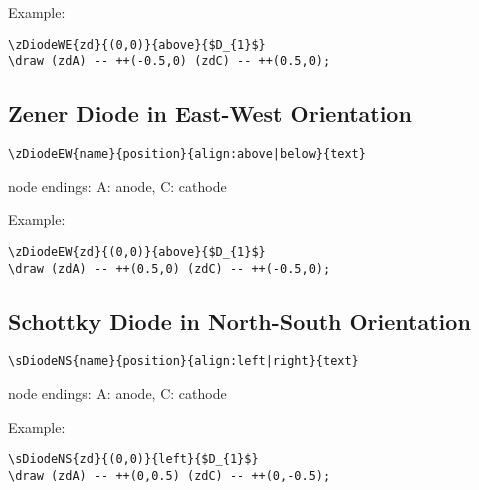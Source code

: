 \documentclass[parskip=full]{scrartcl}
\begin{document}
Example:\\
\begin{minipage}{0.8\textwidth}
\begin{verbatim}
\zDiodeWE{zd}{(0,0)}{above}{$D_{1}$}
\draw (zdA) -- ++(-0.5,0) (zdC) -- ++(0.5,0);
\end{verbatim}
\end{minipage}
\begin{minipage}{0.19\textwidth}
\end{minipage}

\subsection{Zener Diode in East-West Orientation}

\begin{verbatim}
\zDiodeEW{name}{position}{align:above|below}{text}
\end{verbatim}
node endings: A: anode, C: cathode

Example:\\
\begin{minipage}{0.8\textwidth}
\begin{verbatim}
\zDiodeEW{zd}{(0,0)}{above}{$D_{1}$}
\draw (zdA) -- ++(0.5,0) (zdC) -- ++(-0.5,0);
\end{verbatim}
\end{minipage}
\begin{minipage}{0.19\textwidth}
\end{minipage}

\subsection{Schottky Diode in North-South Orientation}

\begin{verbatim}
\sDiodeNS{name}{position}{align:left|right}{text}
\end{verbatim}
node endings: A: anode, C: cathode

Example:\\
\begin{minipage}{0.8\textwidth}
\begin{verbatim}
\sDiodeNS{zd}{(0,0)}{left}{$D_{1}$}
\draw (zdA) -- ++(0,0.5) (zdC) -- ++(0,-0.5);
\end{verbatim}
\end{minipage}
\begin{minipage}{0.19\textwidth}
\end{minipage}
\end{document}
